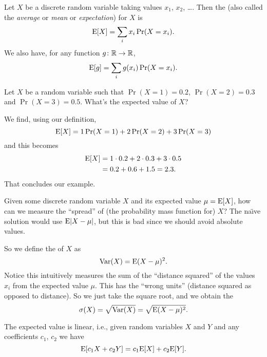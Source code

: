 Let $X$ be a discrete random variable taking values $x_{1}$, $x_{2}$, \dots. 
Then the  (also called the \emph{average} or 
\emph{mean} or \emph{expectation}) for $X$ is
\begin{equation}
\mathrm{E}[X] = \sum_{i}x_{i}\mathop{\mathrm{Pr}}\nolimits(X=x_{i}).
\end{equation}
We also have, for any function $g\colon\mathbb{R}\to\mathbb{R}$,
\begin{equation}
\mathrm{E}[g]=\sum_{i}g(x_{i})\mathop{\mathrm{Pr}}\nolimits(X=x_{i}).
\end{equation}

Let $X$ be a random variable such that $\Pr(X=1)=0.2$, $\Pr(X=2)=0.3$ and $\Pr(X=3)=0.5$. What's the expected value of $X$?

We find, using our definition,
\begin{equation}
\mathrm{E}[X]=1\mathop{\mathrm{Pr}}\nolimits(X=1)+2\mathop{\mathrm{Pr}}\nolimits(X=2)+3\mathop{\mathrm{Pr}}\nolimits(X=3)
\end{equation}
and this becomes
\begin{equation}
\begin{split}
\mathrm{E}[X]&=1\cdot0.2+2\cdot0.3+3\cdot0.5\\
&=0.2+0.6+1.5=2.3.
\end{split}
\end{equation}
That concludes our example.

\M
Given some discrete random variable $X$ and its expected value 
$\mu=\mathrm{E}[X]$, how can we measure the ``spread'' of (the probability 
mass function for) $X$? The na\"{\i}ve solution would use $\mathrm{E}|X-\mu|$, 
but this is bad since we should avoid absolute values.

So we define the  of $X$ as
\begin{equation}
\mathop{\mathrm{Var}}\nolimits(X)=\mathrm{E}(X-\mu)^{2}.
\end{equation}
Notice this intuitively measures the sum of the ``distance squared'' of the 
values $x_i$ from the expected value $\mu$. This has the ``wrong units'' 
(distance squared as opposed to distance). So we just take the square root,
and we obtain the 
\begin{equation}
\sigma(X)=\sqrt{\mathop{\mathrm{Var}}\nolimits(X)}=\sqrt{\mathrm{E}(X-\mu)^{2}}.
\end{equation}

The expected value is linear, i.e., given random variables $X$ and $Y$ and any coefficients $c_1$, $c_2$ we have
\begin{equation}
\mathrm{E}[c_1 X+c_2Y]=c_1\mathrm{E}[X]+c_2\mathrm{E}[Y].
\end{equation}

